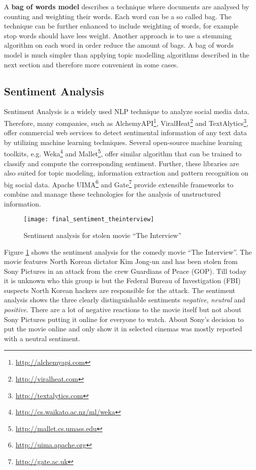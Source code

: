 A \textbf{bag of words model} describes a technique where documents are analysed by counting and weighting their words. Each word can be a so called bag. The technique can be further enhanced to include weighting of words, for example stop words should have less weight. Another approach is to use a stemming algorithm on each word in order reduce the amount of bags. A bag of words model is much simpler than applying topic modelling algorithms described in the next section and therefore more convenient in some cases. \cite[117]{manning2008introduction}


\subsection{Sentiment Analysis}
\label{subsec:sentiment-analysis}
Sentiment Analysis is a widely used NLP technique to analyze social media data. Therefore, many companies, such as AlchemyAPI\footnote{\url{http://alchemyapi.com} \accessednote}, ViralHeat\footnote{\url{http://viralheat.com} \accessednote} and TextAlytics\footnote{\url{http://textalytics.com} \accessednote}, offer commercial web services to detect sentimental information of any text data by utilizing machine learning techniques. Several open-source machine learning toolkits, e.g. Weka\footnote{\url{http://cs.waikato.ac.nz/ml/weka} \accessednote} and Mallet\footnote{\url{http://mallet.cs.umass.edu} \accessednote}, offer similar algorithm that can be trained to classify and compute the corresponding sentiment. Further, these libraries are also suited for topic modeling, information extraction and pattern recognition on big social data. Apache UIMA\footnote{\url{http://uima.apache.org} \accessednote} and Gate\footnote{\url{http://gate.ac.uk} \accessednote} provide extensible frameworks to combine and manage these technologies for the analysis of unstructured information.

\begin{figure}[H]
  \centering
        \texttt{[image: final\_sentiment\_theinterview]}
  \caption[Sentiment analysis for stolen movie \enquote{The Interview}]{Sentiment analysis for stolen movie \enquote{The Interview}}
  \label{fig:sentiment-interview}
  \vspace{-1.3em}
\end{figure}

Figure \ref{fig:sentiment-interview} shows the sentiment analysis for the comedy movie \enquote{The Interview}. The movie features North Korean dictator Kim Jong-un and has been stolen from Sony Pictures in an attack from the crew Guardians of Peace (GOP). Till today it is unknown who this group is but the Federal Bureau of Investigation (FBI) suspects North Korean hackers are responsible for the attack. \cite{guardian2014interview} The sentiment analysis shows the three clearly distinguishable sentiments \textit{negative}, \textit{neutral} and \textit{positive}. There are a lot of negative reactions to the movie itself but not about Sony Pictures putting it online for everyone to watch. About Sony's decision to put the movie online and only show it in selected cinemas was mostly reported with a neutral sentiment.


